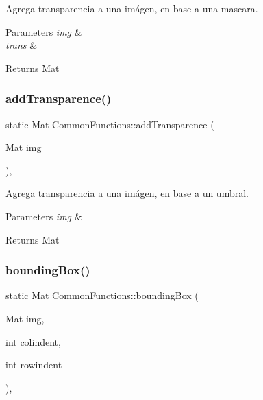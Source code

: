 Agrega transparencia a una imágen, en base a una mascara. 


\begin{DoxyParams}{Parameters}
{\em img} & \\
\hline
{\em trans} & \\
\hline
\end{DoxyParams}
\begin{DoxyReturn}{Returns}
Mat 
\end{DoxyReturn}
\mbox{\label{classCommonFunctions_a66c8badc3cb8d173aaac77a3acdbec4c}} 
\subsubsection{\texorpdfstring{add\+Transparence()}{addTransparence()}}
{\footnotesize\ttfamily static Mat Common\+Functions\+::add\+Transparence (\begin{DoxyParamCaption}\item[{Mat}]{img }\end{DoxyParamCaption})\hspace{0.3cm}{\ttfamily [inline]}, {\ttfamily [static]}}



Agrega transparencia a una imágen, en base a un umbral. 


\begin{DoxyParams}{Parameters}
{\em img} & \\
\hline
\end{DoxyParams}
\begin{DoxyReturn}{Returns}
Mat 
\end{DoxyReturn}
\mbox{\label{classCommonFunctions_a4a2a24e283f18beb6e217993924759c6}} 
\subsubsection{\texorpdfstring{bounding\+Box()}{boundingBox()}\hspace{0.1cm}{\footnotesize\ttfamily [1/2]}}
{\footnotesize\ttfamily static Mat Common\+Functions\+::bounding\+Box (\begin{DoxyParamCaption}\item[{Mat}]{img,  }\item[{int}]{colindent,  }\item[{int}]{rowindent }\end{DoxyParamCaption})\hspace{0.3cm}{\ttfamily [inline]}, {\ttfamily [static]}}



